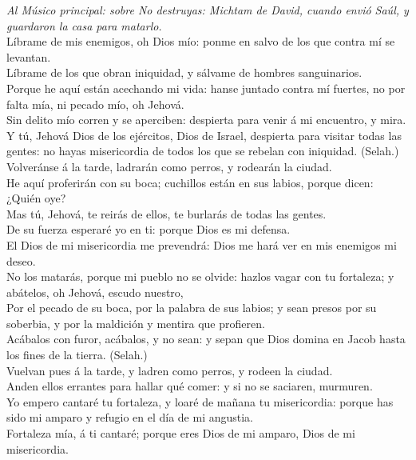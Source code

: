  \emph{Al Músico principal: sobre No destruyas: Michtam de
David, cuando envió Saúl, y guardaron la casa para matarlo.}\\
Líbrame de mis enemigos, oh Dios mío: ponme en salvo de los que contra
mí se levantan.\\
 Líbrame de los que obran iniquidad, y sálvame de hombres
sanguinarios.\\
 Porque he aquí están acechando mi vida: hanse juntado
contra mí fuertes, no por falta mía, ni pecado mío, oh Jehová.\\
 Sin delito mío corren y se aperciben: despierta para venir
á mi encuentro, y mira.\\
 Y tú, Jehová Dios de los ejércitos, Dios de Israel,
despierta para visitar todas las gentes: no hayas misericordia de todos
los que se rebelan con iniquidad. (Selah.)\\
 Volveránse á la tarde, ladrarán como perros, y rodearán la
ciudad.\\
 He aquí proferirán con su boca; cuchillos están en sus
labios, porque dicen: ¿Quién oye?\\
 Mas tú, Jehová, te reirás de ellos, te burlarás de todas
las gentes.\\
 De su fuerza esperaré yo en ti: porque Dios es mi
defensa.\\
 El Dios de mi misericordia me prevendrá: Dios me hará ver
en mis enemigos mi deseo.\\
 No los matarás, porque mi pueblo no se olvide: hazlos
vagar con tu fortaleza; y abátelos, oh Jehová, escudo nuestro,\\
 Por el pecado de su boca, por la palabra de sus labios; y
sean presos por su soberbia, y por la maldición y mentira que
profieren.\\
 Acábalos con furor, acábalos, y no sean: y sepan que Dios
domina en Jacob hasta los fines de la tierra. (Selah.)\\
 Vuelvan pues á la tarde, y ladren como perros, y rodeen la
ciudad.\\
 Anden ellos errantes para hallar qué comer: y si no se
saciaren, murmuren.\\
 Yo empero cantaré tu fortaleza, y loaré de mañana tu
misericordia: porque has sido mi amparo y refugio en el día de mi
angustia.\\
 Fortaleza mía, á ti cantaré; porque eres Dios de mi
amparo, Dios de mi misericordia.

